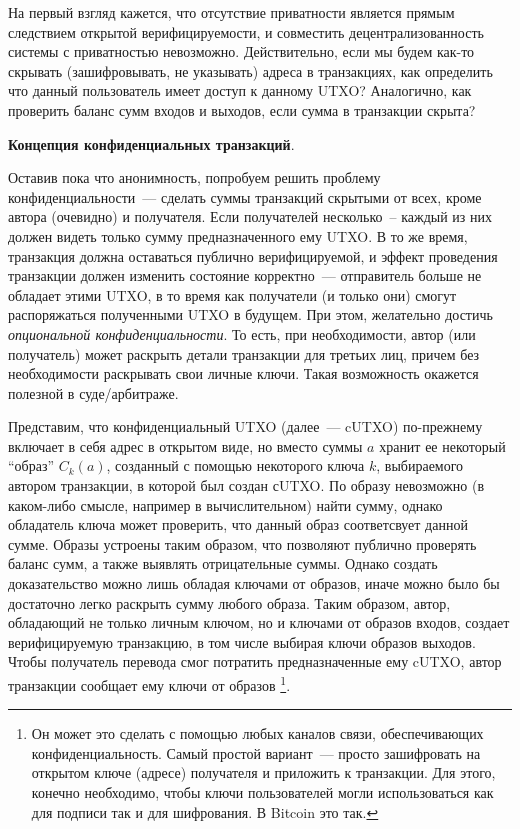 \documentclass{article}
\begin{document}
 На первый взгляд кажется, что отсутствие приватности является прямым следствием
 открытой верифицируемости, и совместить децентрализованность системы с приватностью невозможно.
 Действительно, если мы будем как-то скрывать (зашифровывать, не указывать) адреса в транзакциях, как определить что
 данный пользователь имеет доступ к данному UTXO?
 Аналогично, как проверить баланс сумм входов и выходов, если сумма в транзакции скрыта?

 {\bf Концепция конфиденциальных транзакций}.

 Оставив пока что анонимность, попробуем решить проблему конфиденциальности~---
 сделать суммы транзакций скрытыми от всех, кроме автора (очевидно) и получателя.
 Если получателей несколько~-- каждый из них должен видеть только сумму предназначенного ему UTXO.
 В то же время, транзакция должна оставаться публично верифицируемой,
 и эффект проведения транзакции должен изменить состояние корректно~--- отправитель больше не обладает
 этими UTXO, в то время как получатели (и только они) смогут распоряжаться полученными UTXO в будущем.
 При этом, желательно достичь \textit{опциональной конфиденциальности}.
 То есть, при необходимости, автор (или получатель) может раскрыть детали транзакции для
 третьих лиц, причем без необходимости раскрывать свои личные ключи.
 Такая возможность окажется полезной в суде/арбитраже.

  Представим, что конфиденциальный UTXO (далее~--- cUTXO) по-прежнему включает
  в себя адрес в открытом виде,
 но вместо суммы $a$ хранит ее некоторый ``образ'' $C_k(a)$,
 созданный с помощью некоторого ключа $k$, выбираемого автором транзакции, в которой был создан сUTXO.
 По образу невозможно (в каком-либо смысле, например в вычислительном) найти сумму,
 однако обладатель ключа может проверить, что данный образ соответсвует данной сумме.
 Образы устроены таким образом, что позволяют публично проверять баланс сумм,
 а также выявлять отрицательные суммы.
 Однако создать доказательство можно лишь обладая ключами от образов,
 иначе можно было бы достаточно легко раскрыть сумму любого образа.
 Таким образом, автор, обладающий не только личным ключом, но и ключами от образов входов,
  создает верифицируемую транзакцию, в том числе выбирая ключи образов выходов.
 Чтобы получатель перевода смог потратить предназначенные ему cUTXO,
 автор транзакции сообщает ему ключи от образов
 \footnote{Он может это сделать с помощью любых каналов связи, обеспечивающих конфиденциальность.
 Самый простой вариант~--- просто зашифровать на открытом ключе (адресе) получателя и приложить к транзакции.
 Для этого, конечно необходимо, чтобы ключи пользователей могли использоваться как для подписи так и для шифрования.
 В Bitcoin это так.}.
\end{document}
